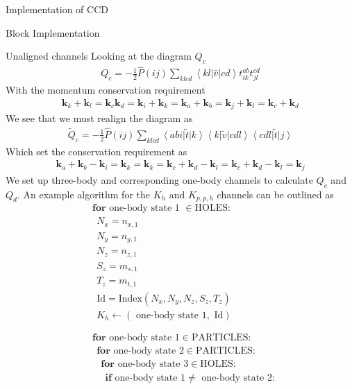 \documentclass[twoside,english]{uiofysmaster}
\begin{document}
\begin{chapter}{Implementation of CCD}
\begin{section}{Block Implementation}
\begin{subsection}{Unaligned channels}
			Looking at the diagram $Q_c$
			\begin{align}
				Q_c = -\frac{1}{2} \hat P(ij) \sum_{klcd} \left<kl|\hat v|cd\right> t_{ik}^{ab} t_{jl}^{cd}
			\end{align}
			With the momentum conservation requirement
			\begin{align}
				\mathbf{k}_k + \mathbf{k}_l = \mathbf{k}_c \mathbf{k}_d = \mathbf{k}_i + \mathbf{k}_k = \mathbf{k}_a + \mathbf{k}_b = \mathbf{k}_j + \mathbf{k}_l = \mathbf{k}_c + \mathbf{k}_d
			\end{align}
			We see that we must realign the diagram as
			\begin{align}
				\tilde Q_c = -\frac{1}{2} \hat P(ij) \sum_{klcd} \left<abi\right|\tilde t\left|k\right> \left<k\right|\tilde v\left|cdl\right> \left<cdl\right|\tilde t\left|j\right>
			\end{align}
			Which set the conservation requirement as 
			\begin{align}
				\mathbf{k}_a + \mathbf{k}_b	- \mathbf{k}_i = \mathbf{k}_k = \mathbf{k}_k = \mathbf{k}_c + \mathbf{k}_d - \mathbf{k}_l = \mathbf{k}_c + \mathbf{k}_d - \mathbf{k}_l = \mathbf{k}_j
			\end{align}
			We set up three-body and corresponding one-body channels to calculate $Q_c$ and $Q_d$. An example algorithm for the $K_h$ and $K_{p,p,h}$ channels can be outlined as
			\begin{align*}
				&\mathbf{for } \text{ one-body state 1 } \in \text{HOLES}:\\
				&\:\: N_x = n_{x,1}\\
				&\:\: N_y = n_{y,1}\\
				&\:\: N_z = n_{z,1}\\
 				&\:\: S_z = m_{s,1}\\
				&\:\: T_z = m_{t,1}\\
				&\:\: \text{Id} = \text{Index}(N_x,N_y,N_z,S_z,T_z) \\
				&\:\: K_h \leftarrow (\text{ one-body state 1}, \text{ Id}) \\ \\ \\ 
				&\mathbf{for } \text{ one-body state 1} \in \text{PARTICLES}: \\
				&\:\: \mathbf{for } \text{ one-body state 2} \in \text{PARTICLES}: \\
				&\:\:\:\: \mathbf{for } \text{ one-body state 3} \in \text{HOLES}: \\
				&\:\:\:\:\:\: \mathbf{if} \text{ one-body state 1} \neq \text{ one-body state 2}: \\

\end{align*}
\end{subsection}
\end{section}
\end{chapter}
\end{document}
